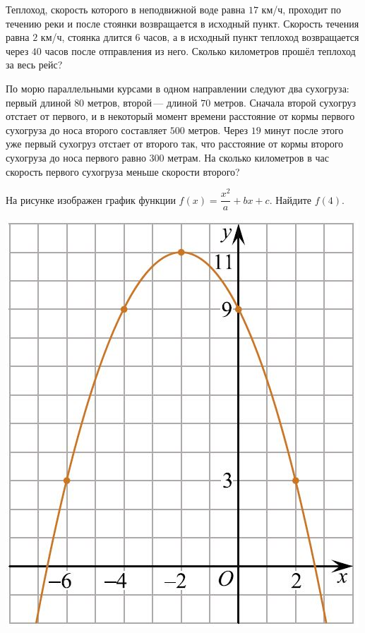 \begin{homework}[number=2]
	\begin{listofex}
		\item Теплоход, скорость которого в неподвижной воде равна \( 17 \) км/ч, проходит по течению реки и после стоянки возвращается в исходный пункт. Скорость течения равна \( 2 \) км/ч, стоянка длится \( 6 \) часов, а в исходный пункт теплоход возвращается через \( 40 \) часов после отправления из него. Сколько километров прошёл теплоход за весь рейс?
		\item По морю параллельными курсами в одном направлении следуют два сухогруза: первый длиной \( 80 \) метров, второй --- длиной \( 70 \) метров. Сначала второй сухогруз отстает от первого, и в некоторый момент времени расстояние от кормы первого сухогруза до носа второго составляет \( 500 \) метров. Через \( 19 \) минут после этого уже первый сухогруз отстает от второго так, что расстояние от кормы второго сухогруза до носа первого равно \( 300 \) метрам. На сколько километров в час скорость первого сухогруза меньше скорости второго?
		\item
		\begin{minipage}[t]{0.2\textwidth}
			На рисунке изображен график функции \( f(x)=\dfrac{x^2}{a}+bx+c \). Найдите \( f(4) \).
		\end{minipage} 
		\begin{minipage}[c]{0.2\textwidth}
			\includegraphics[align=t, width=\textwidth]{../../pics/G112M3C2-4}
		\end{minipage}
	\end{listofex}
\end{homework}

